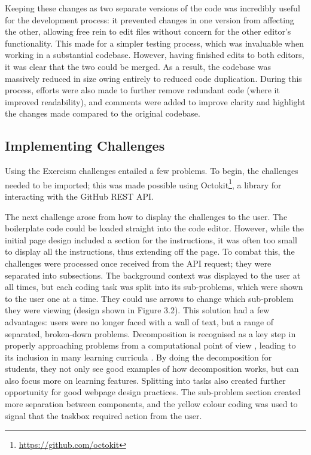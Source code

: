 Keeping these changes as two separate versions of the code was incredibly useful for the development process: it prevented changes in one version from affecting the other, allowing free rein to edit files without concern for the other editor's functionality. This made for a simpler testing process, which was invaluable when working in a substantial codebase. However, having finished edits to both editors, it was clear that the two could be merged. As a result, the codebase was massively reduced in size owing entirely to reduced code duplication. During this process, efforts were also made to further remove redundant code (where it improved readability), and comments were added to improve clarity and highlight the changes made compared to the original codebase.

\subsection{Implementing Challenges}

Using the Exercism challenges entailed a few problems. To begin, the challenges needed to be imported; this was made possible using Octokit\footnote{\href{https://github.com/octokit}{https://github.com/octokit}}, a library for interacting with the GitHub REST API. 

The next challenge arose from how to display the challenges to the user. The boilerplate code could be loaded straight into the code editor. However, while the initial page design included a section for the instructions, it was often too small to display all the instructions, thus extending off the page. To combat this, the challenges were processed once received from the API request; they were separated into subsections. The background context was displayed to the user at all times, but each coding task was split into its sub-problems, which were shown to the user one at a time. They could use arrows to change which sub-problem they were viewing (design shown in Figure 3.2). This solution had a few advantages: users were no longer faced with a wall of text, but a range of separated, broken-down problems.
Decomposition is recognised as a key step in properly approaching problems from a computational point of view \cite{wing_computational_2006}, leading to its inclusion in many learning curricula \cite{noauthor_national_2013, joint_task_force_on_computing_curricula_computer_2013}. By doing the decomposition for students, they not only see good examples of how decomposition works, but can also focus more on learning features. Splitting into tasks also created further opportunity for good webpage design practices. The sub-problem section created more separation between components, and the yellow colour coding was used to signal that the taskbox required action from the user.

